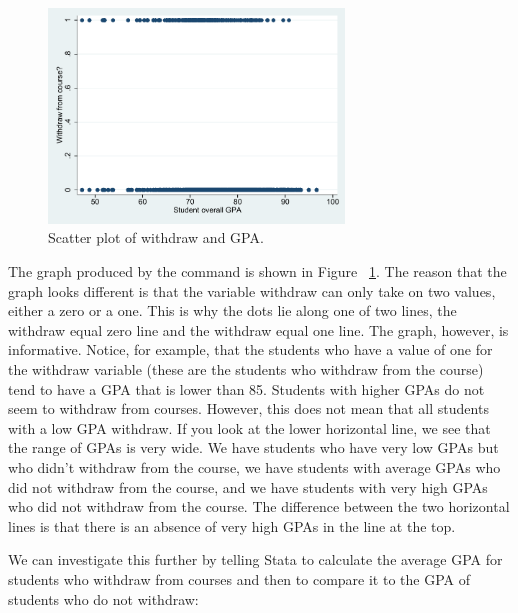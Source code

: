 \documentclass[a4paper,12pt,oneside]{book}
\begin{document}
\begin{stlog}\end{stlog}
\begin{figure}[h]
    \centering
    \includegraphics[width=0.7\textwidth]{book_5.pdf}
    \caption{Scatter plot of withdraw and GPA.}
    \label{fig:scatterplot}
\end{figure}

The graph produced by the command is shown in Figure ~\ref{fig:scatterplot}. The reason that the graph looks different is that the variable withdraw can only take on two values, either a zero or a one. This is why the dots lie along 
one of two lines, the withdraw equal zero line and the withdraw equal one line. The graph, however, is informative. Notice, for example, that the students who have a value of one for the withdraw variable 
(these are the students who withdraw from the course) tend to have a GPA that is lower than 85. Students with higher GPAs do not seem to withdraw from courses. However, this does not mean that all students 
with a low GPA withdraw. If you look at the lower horizontal line, we see that the range of GPAs is very wide. We have students who have very low GPAs but who didn’t withdraw from the course, we have students 
with average GPAs who did not withdraw from the course, and we have students with very high GPAs who did not withdraw from the course. The difference between the two horizontal lines is that there is an 
absence of very high GPAs in the line at the top.

We can investigate this further by telling Stata to calculate the average GPA for students who withdraw from courses and then to compare it to the GPA of students who do not withdraw:

\begin{stlog}\end{stlog}
\end{document}
